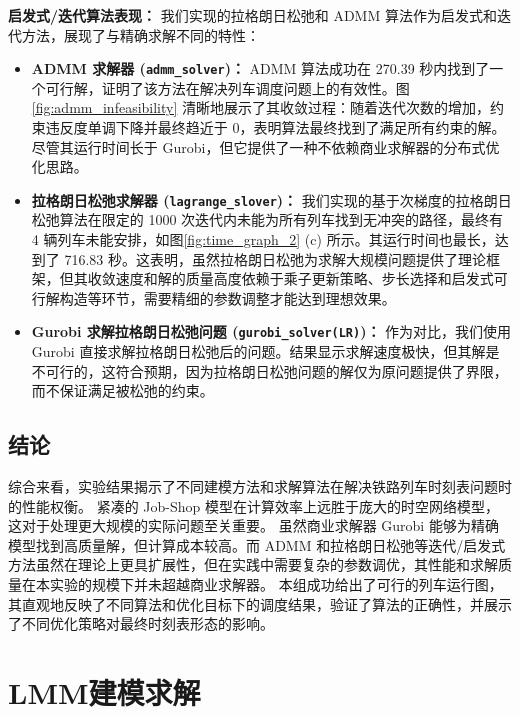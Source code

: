 \documentclass{article}
\begin{document}
    \textbf{启发式/迭代算法表现：}
    我们实现的拉格朗日松弛和 ADMM 算法作为启发式和迭代方法，展现了与精确求解不同的特性：
    \begin{itemize}
        \item \textbf{ADMM 求解器 (\texttt{admm\_solver})：} ADMM 算法成功在 270.39 秒内找到了一个可行解，证明了该方法在解决列车调度问题上的有效性。图 \ref{fig:admm_infeasibility} 清晰地展示了其收敛过程：随着迭代次数的增加，约束违反度单调下降并最终趋近于 0，表明算法最终找到了满足所有约束的解。尽管其运行时间长于 Gurobi，但它提供了一种不依赖商业求解器的分布式优化思路。
        \item \textbf{拉格朗日松弛求解器 (\texttt{lagrange\_slover})：} 我们实现的基于次梯度的拉格朗日松弛算法在限定的 1000 次迭代内未能为所有列车找到无冲突的路径，最终有 4 辆列车未能安排，如图\ref{fig:time_graph_2} (c) 所示。其运行时间也最长，达到了 716.83 秒。这表明，虽然拉格朗日松弛为求解大规模问题提供了理论框架，但其收敛速度和解的质量高度依赖于乘子更新策略、步长选择和启发式可行解构造等环节，需要精细的参数调整才能达到理想效果。
        \item \textbf{Gurobi 求解拉格朗日松弛问题 (\texttt{gurobi\_solver(LR)})：} 作为对比，我们使用 Gurobi 直接求解拉格朗日松弛后的问题。结果显示求解速度极快，但其解是不可行的，这符合预期，因为拉格朗日松弛问题的解仅为原问题提供了界限，而不保证满足被松弛的约束。
    \end{itemize}

    \subsection{结论}
    综合来看，实验结果揭示了不同建模方法和求解算法在解决铁路列车时刻表问题时的性能权衡。 紧凑的 Job-Shop 模型在计算效率上远胜于庞大的时空网络模型，这对于处理更大规模的实际问题至关重要。
    虽然商业求解器 Gurobi 能够为精确模型找到高质量解，但计算成本较高。而 ADMM 和拉格朗日松弛等迭代/启发式方法虽然在理论上更具扩展性，但在实践中需要复杂的参数调优，其性能和求解质量在本实验的规模下并未超越商业求解器。
    本组成功给出了可行的列车运行图，其直观地反映了不同算法和优化目标下的调度结果，验证了算法的正确性，并展示了不同优化策略对最终时刻表形态的影响。


    \section{LMM建模求解}
\end{document}
